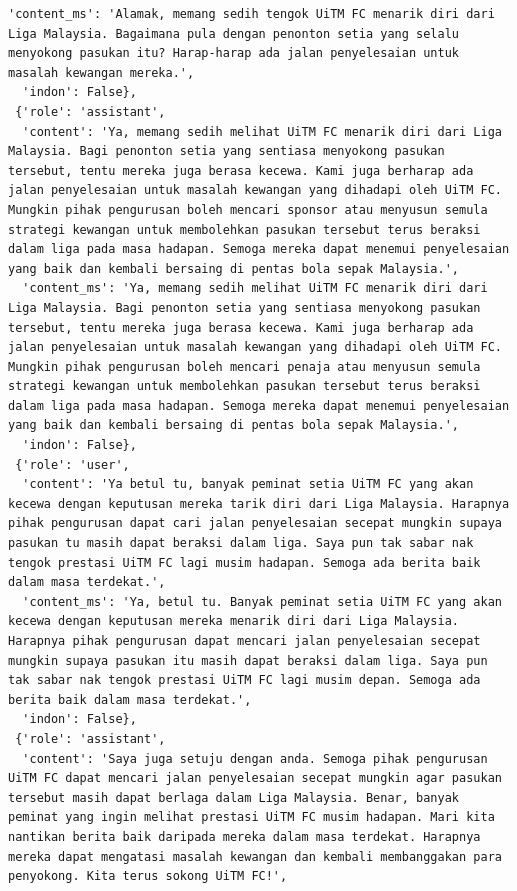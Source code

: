 \documentclass{article}
\begin{document}
\begin{lstlisting}[breaklines=true]
  'content_ms': 'Alamak, memang sedih tengok UiTM FC menarik diri dari Liga Malaysia. Bagaimana pula dengan penonton setia yang selalu menyokong pasukan itu? Harap-harap ada jalan penyelesaian untuk masalah kewangan mereka.',
  'indon': False},
 {'role': 'assistant',
  'content': 'Ya, memang sedih melihat UiTM FC menarik diri dari Liga Malaysia. Bagi penonton setia yang sentiasa menyokong pasukan tersebut, tentu mereka juga berasa kecewa. Kami juga berharap ada jalan penyelesaian untuk masalah kewangan yang dihadapi oleh UiTM FC. Mungkin pihak pengurusan boleh mencari sponsor atau menyusun semula strategi kewangan untuk membolehkan pasukan tersebut terus beraksi dalam liga pada masa hadapan. Semoga mereka dapat menemui penyelesaian yang baik dan kembali bersaing di pentas bola sepak Malaysia.',
  'content_ms': 'Ya, memang sedih melihat UiTM FC menarik diri dari Liga Malaysia. Bagi penonton setia yang sentiasa menyokong pasukan tersebut, tentu mereka juga berasa kecewa. Kami juga berharap ada jalan penyelesaian untuk masalah kewangan yang dihadapi oleh UiTM FC. Mungkin pihak pengurusan boleh mencari penaja atau menyusun semula strategi kewangan untuk membolehkan pasukan tersebut terus beraksi dalam liga pada masa hadapan. Semoga mereka dapat menemui penyelesaian yang baik dan kembali bersaing di pentas bola sepak Malaysia.',
  'indon': False},
 {'role': 'user',
  'content': 'Ya betul tu, banyak peminat setia UiTM FC yang akan kecewa dengan keputusan mereka tarik diri dari Liga Malaysia. Harapnya pihak pengurusan dapat cari jalan penyelesaian secepat mungkin supaya pasukan tu masih dapat beraksi dalam liga. Saya pun tak sabar nak tengok prestasi UiTM FC lagi musim hadapan. Semoga ada berita baik dalam masa terdekat.',
  'content_ms': 'Ya, betul tu. Banyak peminat setia UiTM FC yang akan kecewa dengan keputusan mereka menarik diri dari Liga Malaysia. Harapnya pihak pengurusan dapat mencari jalan penyelesaian secepat mungkin supaya pasukan itu masih dapat beraksi dalam liga. Saya pun tak sabar nak tengok prestasi UiTM FC lagi musim depan. Semoga ada berita baik dalam masa terdekat.',
  'indon': False},
 {'role': 'assistant',
  'content': 'Saya juga setuju dengan anda. Semoga pihak pengurusan UiTM FC dapat mencari jalan penyelesaian secepat mungkin agar pasukan tersebut masih dapat berlaga dalam Liga Malaysia. Benar, banyak peminat yang ingin melihat prestasi UiTM FC musim hadapan. Mari kita nantikan berita baik daripada mereka dalam masa terdekat. Harapnya mereka dapat mengatasi masalah kewangan dan kembali membanggakan para penyokong. Kita terus sokong UiTM FC!',

\end{lstlisting}
\end{document}
